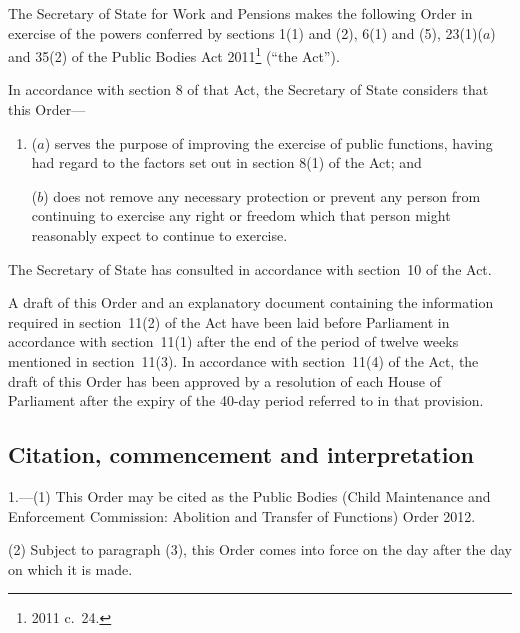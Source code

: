 \documentclass[12pt,a4paper]{article}
\title{\regstitle}
\author{S.I.\ 2012 No.\ 2007}
\date{Made
31st July 2012\\
Coming into~force
in accordance with article 1
}
\begin{document}
\maketitle

\noindent
The Secretary of State for Work and Pensions makes the following Order in exercise of the powers conferred by sections 1(1) and (2), 6(1) and (5), 23(1)($a$)  and 35(2) of the Public Bodies Act 2011\footnote{2011 c.~24.} (“the Act”).

In accordance with section 8 of that Act, the Secretary of State considers that this Order—
\begin{enumerate}\item[]
($a$) serves the purpose of improving the exercise of public functions, having had regard to the factors set out in section 8(1) of the Act; and

($b$) does not remove any necessary protection or prevent any person from continuing to exercise any right or freedom which that person might reasonably expect to continue to exercise.
\end{enumerate}

The Secretary of State has consulted in accordance with section~10 of the Act.

A draft of this Order and an explanatory document containing the information required in section~11(2) of the Act have been laid before Parliament in accordance with section~11(1) after the end of the period of twelve weeks mentioned in section~11(3). In accordance with section~11(4) of the Act, the draft of this Order has been approved by a resolution of each House of Parliament after the expiry of the 40-day period referred to in that provision. 

{\sloppy

\tableofcontents

}

\bigskip

\setcounter{secnumdepth}{-2}

\subsection[1. Citation, commencement and interpretation]{Citation, commencement and interpretation}

1.---(1)  This Order may be cited as the Public Bodies (Child Maintenance and Enforcement Commission: Abolition and Transfer of Functions) Order 2012.

(2) Subject to paragraph (3), this Order comes into force on the day after the day on which it is made.
\end{document}
